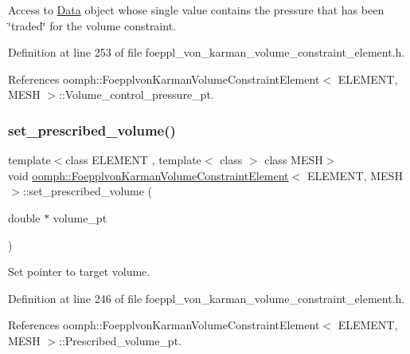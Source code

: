 Access to \hyperlink{classoomph_1_1Data}{Data} object whose single value contains the pressure that has been \char`\"{}traded\char`\"{} for the volume constraint. 



Definition at line 253 of file foeppl\+\_\+von\+\_\+karman\+\_\+volume\+\_\+constraint\+\_\+element.\+h.



References oomph\+::\+Foepplvon\+Karman\+Volume\+Constraint\+Element$<$ E\+L\+E\+M\+E\+N\+T, M\+E\+S\+H $>$\+::\+Volume\+\_\+control\+\_\+pressure\+\_\+pt.

\mbox{\label{classoomph_1_1FoepplvonKarmanVolumeConstraintElement_a91f7e77ffeaf09914838d9af945c2c56}} 
\subsubsection{\texorpdfstring{set\+\_\+prescribed\+\_\+volume()}{set\_prescribed\_volume()}}
{\footnotesize\ttfamily template$<$class E\+L\+E\+M\+E\+NT , template$<$ class $>$ class M\+E\+SH$>$ \\
void \hyperlink{classoomph_1_1FoepplvonKarmanVolumeConstraintElement}{oomph\+::\+Foepplvon\+Karman\+Volume\+Constraint\+Element}$<$ E\+L\+E\+M\+E\+NT, M\+E\+SH $>$\+::set\+\_\+prescribed\+\_\+volume (\begin{DoxyParamCaption}\item[{double $\ast$}]{volume\+\_\+pt }\end{DoxyParamCaption})\hspace{0.3cm}{\ttfamily [inline]}}



Set pointer to target volume. 



Definition at line 246 of file foeppl\+\_\+von\+\_\+karman\+\_\+volume\+\_\+constraint\+\_\+element.\+h.



References oomph\+::\+Foepplvon\+Karman\+Volume\+Constraint\+Element$<$ E\+L\+E\+M\+E\+N\+T, M\+E\+S\+H $>$\+::\+Prescribed\+\_\+volume\+\_\+pt.



